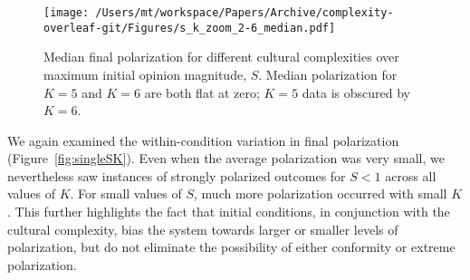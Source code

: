 \begin{figure}[H]
  \centering
    \texttt{[image: /Users/mt/workspace/Papers/Archive/complexity-overleaf-git/Figures/s\_k\_zoom\_2-6\_median.pdf]}
  \caption{Median final polarization for different cultural complexities over
    maximum initial opinion magnitude, $S$.
    Median polarization for $K=5$ and $K=6$ are both flat at zero; $K=5$ 
    data is obscured by $K=6$.  
  }
  \label{fig:SMedian}
\end{figure}




We again examined the within-condition variation in final polarization (Figure~\ref{fig:singleSK}). Even when the average polarization was very small, we nevertheless saw instances of strongly polarized outcomes for $S < 1$ across all values of $K$. For small values of $S$, much more polarization occurred with small $K$. 
This further highlights the fact that initial conditions, in conjunction with the cultural complexity, bias the system towards larger or smaller levels of polarization, but do not eliminate the possibility of either conformity or extreme polarization.


